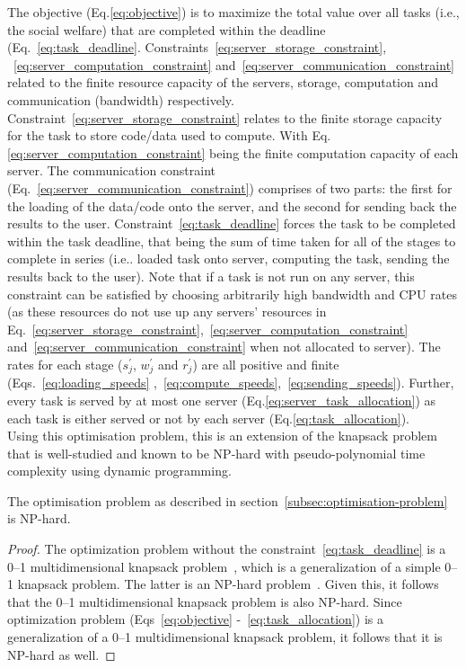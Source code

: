 The objective (Eq.\eqref{eq:objective}) is to maximize the total value over all tasks (i.e., the social welfare) that
are completed within the deadline (Eq.~\eqref{eq:task_deadline}. Constraints~\eqref{eq:server_storage_constraint},
~\eqref{eq:server_computation_constraint} and~\eqref{eq:server_communication_constraint} related to the finite resource
capacity of the servers, storage, computation and communication (bandwidth) respectively.
Constraint~\eqref{eq:server_storage_constraint} relates to the finite storage capacity for the task to store code/data
used to compute. With Eq.\eqref{eq:server_computation_constraint} being the finite computation capacity of each server.
The communication constraint (Eq.~\eqref{eq:server_communication_constraint}) comprises of two parts: the first for the
loading of the data/code onto the server, and the second for sending back the results to the user.
Constraint~\eqref{eq:task_deadline} forces the task to be completed within the task deadline, that being the sum of
time taken for all of the stages to complete in series (i.e.. loaded task onto server, computing the task, sending the
results back to the user). Note that if a task is not run on any server, this constraint can be satisfied by choosing
arbitrarily high bandwidth and CPU rates (as these resources do not use up any servers' resources in
Eq.~\eqref{eq:server_storage_constraint},~\eqref{eq:server_computation_constraint}
and~\eqref{eq:server_communication_constraint} when not allocated to server). The rates for each stage
($s^{'}_j$, $w^{'}_j$ and $r^{'}_j$) are all positive and finite (Eqs.~\eqref{eq:loading_speeds}
,~\eqref{eq:compute_speeds},~\eqref{eq:sending_speeds}). Further, every task is served by at most one server
(Eq.\eqref{eq:server_task_allocation}) as each task is either served or not by each server
(Eq.\eqref{eq:task_allocation}). \\


Using this optimisation problem, this is an extension of the knapsack problem that is well-studied and known to be
NP-hard with pseudo-polynomial time complexity using dynamic programming.
\begin{theorem}
    The optimisation problem as described in section~\ref{subsec:optimisation-problem} is NP-hard.
\end{theorem}
\begin{proof}
    The optimization problem without the constraint~\eqref{eq:task_deadline} is a 0--1 multidimensional knapsack
    problem~\cite{knapsackproblems_2004}, which is a generalization of a simple 0--1 knapsack problem. The latter is an
    NP-hard problem~\cite{knapsackproblems_2004}. Given this, it follows that the 0--1 multidimensional knapsack problem
    is also NP-hard. Since optimization problem (Eqs~\eqref{eq:objective} -~\eqref{eq:task_allocation}) is a
    generalization of a 0--1 multidimensional knapsack problem, it follows that it is NP-hard as well.
\end{proof}

